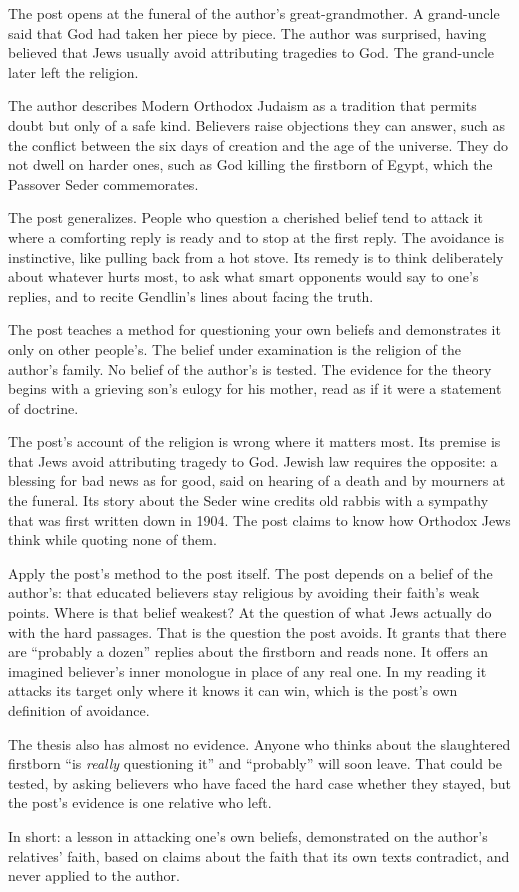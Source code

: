 \begin{afterword}
\summaryhead

The post opens at the funeral of the author's great-grandmother. A grand-uncle said that God had taken her piece by piece. The author was surprised, having believed that Jews usually avoid attributing tragedies to God. The grand-uncle later left the religion.

The author describes Modern Orthodox Judaism as a tradition that permits doubt but only of a safe kind. Believers raise objections they can answer, such as the conflict between the six days of creation and the age of the universe. They do not dwell on harder ones, such as God killing the firstborn of Egypt, which the Passover Seder commemorates.

The post generalizes. People who question a cherished belief tend to attack it where a comforting reply is ready and to stop at the first reply. The avoidance is instinctive, like pulling back from a hot stove. Its remedy is to think deliberately about whatever hurts most, to ask what smart opponents would say to one's replies, and to recite Gendlin's lines about facing the truth.

\responsehead

The post teaches a method for questioning your own beliefs and demonstrates it only on other people's. The belief under examination is the religion of the author's family. No belief of the author's is tested. The evidence for the theory begins with a grieving son's eulogy for his mother, read as if it were a statement of doctrine.

The post's account of the religion is wrong where it matters most. Its premise is that Jews avoid attributing tragedy to God. Jewish law requires the opposite: a blessing for bad news as for good, said on hearing of a death and by mourners at the funeral. Its story about the Seder wine credits old rabbis with a sympathy that was first written down in 1904. The post claims to know how Orthodox Jews think while quoting none of them.

Apply the post's method to the post itself. The post depends on a belief of the author's: that educated believers stay religious by avoiding their faith's weak points. Where is that belief weakest? At the question of what Jews actually do with the hard passages. That is the question the post avoids. It grants that there are ``probably a dozen'' replies about the firstborn and reads none. It offers an imagined believer's inner monologue in place of any real one. In my reading it attacks its target only where it knows it can win, which is the post's own definition of avoidance.

The thesis also has almost no evidence. Anyone who thinks about the slaughtered firstborn ``is \emph{really} questioning it'' and ``probably'' will soon leave. That could be tested, by asking believers who have faced the hard case whether they stayed, but the post's evidence is one relative who left.

In short: a lesson in attacking one's own beliefs, demonstrated on the author's relatives' faith, based on claims about the faith that its own texts contradict, and never applied to the author.
\end{afterword}
